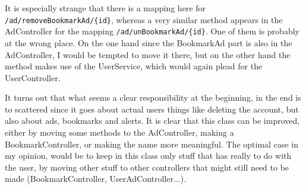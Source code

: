 \documentclass[a4wide]{article}
\begin{document}
It is especially strange that there is a mapping here for \texttt{/ad/removeBookmarkAd/\{id\}}, whereas a very similar method appears in the AdController for the mapping \texttt{/ad/unBookmarkAd/\{id\}}. One of them is probably at the wrong place. On the one hand since the BookmarkAd part is also in the AdController, I would be tempted to move it there, but on the other hand the method makes use of the UserService, which would again plead for the UserController. 

It turns out that what seems a clear responsibility at the beginning, in the end is to scattered since it goes about actual users things like deleting the account, but also about ads, bookmarks and alerts. It is clear that this class can be improved, either by moving some methods to the AdController, making a BookmarkController, or making the name more meaningful. The optimal case in my opinion, would be to keep in this class only stuff that has really to do with the user, by moving other stuff to other controllers that might still need to be made (BookmarkController, UserAdController...). 
\end{document}
